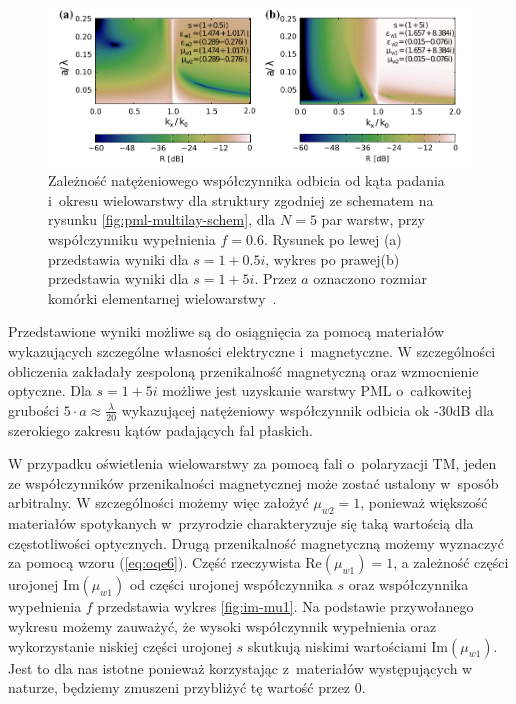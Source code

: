 \begin{figure}[tb]
	\includegraphics[width=\textwidth]{images/pml/fig3.png}
	\caption{Zależność natężeniowego współczynnika odbicia od kąta padania i~okresu wielowarstwy dla struktury zgodniej ze schematem na rysunku \ref{fig:pml-multilay-schem}, dla $N=5$ par warstw, przy współczynniku wypełnienia $f=0.6$. Rysunek po lewej (a) przedstawia wyniki dla $s=1+0.5i$, wykres po prawej(b) przedstawia wyniki dla $s=1+5i$. Przez $a$ oznaczono rozmiar komórki elementarnej wielowarstwy~\cite{ania2015}.}
	\label{fig:oqe3}
\end{figure}

Przedstawione wyniki możliwe są do osiągnięcia za pomocą materiałów wykazujących szczególne własności elektryczne i~magnetyczne. W szczególności obliczenia zakładały zespoloną przenikalność magnetyczną oraz wzmocnienie optyczne. Dla $s=1+5i$ możliwe jest uzyskanie warstwy PML o~całkowitej grubości $5\cdot a \approx \frac{\lambda}{20}$ wykazującej natężeniowy współczynnik odbicia ok -30dB dla szerokiego zakresu kątów padających fal płaskich.

W przypadku oświetlenia wielowarstwy za pomocą fali o~polaryzacji TM, jeden ze współczynników przenikalności magnetycznej może zostać ustalony w~sposób arbitralny. W szczególności możemy więc założyć $\mu_{w2}=1$, ponieważ większość materiałów spotykanych w~przyrodzie charakteryzuje się taką wartością dla częstotliwości optycznych. Drugą przenikalność magnetyczną możemy wyznaczyć za pomocą wzoru (\ref{eq:oqe6}). Część rzeczywista $\textrm{Re}(\mu_{w1})=1$, a zależność części urojonej $\textrm{Im}(\mu_{w1})$ od części urojonej współczynnika $s$ oraz współczynnika wypełnienia $f$ przedstawia wykres \ref{fig:im-mu1}. Na podstawie przywołanego wykresu możemy zauważyć, że wysoki współczynnik wypełnienia oraz wykorzystanie niskiej części urojonej $s$ skutkują niskimi wartościami $\textrm{Im}(\mu_{w1})$. Jest to dla nas istotne ponieważ korzystając z~materiałów występujących w naturze, będziemy zmuszeni przybliżyć tę wartość przez $0$.

